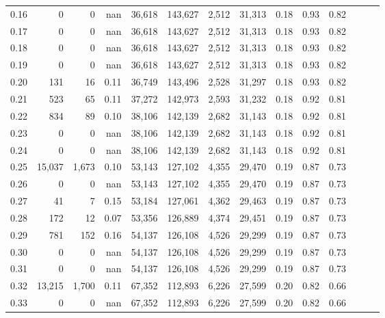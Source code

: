 \begin{tabular}{rrrrrrrrrrrrrr}
0.16 &       0 &      0 &   nan &   36,618 &  143,627 &   2,512 &  31,313 &  0.18 &  0.93 &      0.82 \\
0.17 &       0 &      0 &   nan &   36,618 &  143,627 &   2,512 &  31,313 &  0.18 &  0.93 &      0.82 \\
0.18 &       0 &      0 &   nan &   36,618 &  143,627 &   2,512 &  31,313 &  0.18 &  0.93 &      0.82 \\
0.19 &       0 &      0 &   nan &   36,618 &  143,627 &   2,512 &  31,313 &  0.18 &  0.93 &      0.82 \\
0.20 &     131 &     16 &  0.11 &   36,749 &  143,496 &   2,528 &  31,297 &  0.18 &  0.93 &      0.82 \\
0.21 &     523 &     65 &  0.11 &   37,272 &  142,973 &   2,593 &  31,232 &  0.18 &  0.92 &      0.81 \\
0.22 &     834 &     89 &  0.10 &   38,106 &  142,139 &   2,682 &  31,143 &  0.18 &  0.92 &      0.81 \\
0.23 &       0 &      0 &   nan &   38,106 &  142,139 &   2,682 &  31,143 &  0.18 &  0.92 &      0.81 \\
0.24 &       0 &      0 &   nan &   38,106 &  142,139 &   2,682 &  31,143 &  0.18 &  0.92 &      0.81 \\
0.25 &  15,037 &  1,673 &  0.10 &   53,143 &  127,102 &   4,355 &  29,470 &  0.19 &  0.87 &      0.73 \\
0.26 &       0 &      0 &   nan &   53,143 &  127,102 &   4,355 &  29,470 &  0.19 &  0.87 &      0.73 \\
0.27 &      41 &      7 &  0.15 &   53,184 &  127,061 &   4,362 &  29,463 &  0.19 &  0.87 &      0.73 \\
0.28 &     172 &     12 &  0.07 &   53,356 &  126,889 &   4,374 &  29,451 &  0.19 &  0.87 &      0.73 \\
0.29 &     781 &    152 &  0.16 &   54,137 &  126,108 &   4,526 &  29,299 &  0.19 &  0.87 &      0.73 \\
0.30 &       0 &      0 &   nan &   54,137 &  126,108 &   4,526 &  29,299 &  0.19 &  0.87 &      0.73 \\
0.31 &       0 &      0 &   nan &   54,137 &  126,108 &   4,526 &  29,299 &  0.19 &  0.87 &      0.73 \\
0.32 &  13,215 &  1,700 &  0.11 &   67,352 &  112,893 &   6,226 &  27,599 &  0.20 &  0.82 &      0.66 \\
0.33 &       0 &      0 &   nan &   67,352 &  112,893 &   6,226 &  27,599 &  0.20 &  0.82 &      0.66 \\

\end{tabular}

